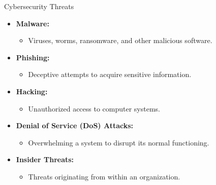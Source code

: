 \begin{frame}{Cybersecurity Threats}
  \begin{itemize}
    \item \textbf{Malware:}
      \begin{itemize}
        \item Viruses, worms, ransomware, and other malicious software.
      \end{itemize}
    \item \textbf{Phishing:}
      \begin{itemize}
        \item Deceptive attempts to acquire sensitive information.
      \end{itemize}
    \item \textbf{Hacking:}
      \begin{itemize}
        \item Unauthorized access to computer systems.
      \end{itemize}
    \item \textbf{Denial of Service (DoS) Attacks:}
      \begin{itemize}
        \item Overwhelming a system to disrupt its normal functioning.
      \end{itemize}
    \item \textbf{Insider Threats:}
      \begin{itemize}
        \item Threats originating from within an organization.
      \end{itemize}
  \end{itemize}
\end{frame}

